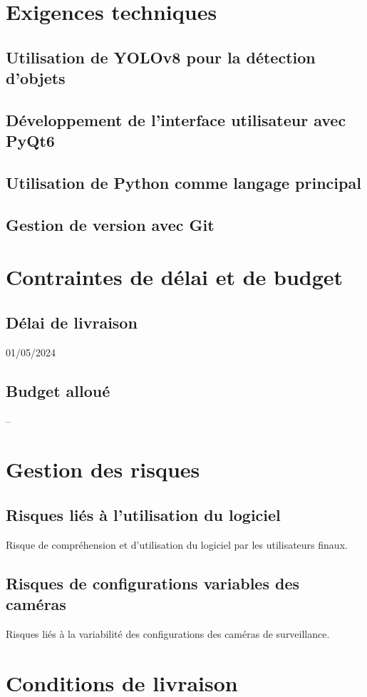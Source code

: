 \documentclass{article}
\begin{document}
\section{Exigences techniques}
\subsection{Utilisation de YOLOv8 pour la détection d'objets}
\subsection{Développement de l'interface utilisateur avec PyQt6}
\subsection{Utilisation de Python comme langage principal}
\subsection{Gestion de version avec Git}

\section{Contraintes de délai et de budget}
\subsection{Délai de livraison}
01/05/2024
\subsection{Budget alloué}
--

\section{Gestion des risques}
\subsection{Risques liés à l'utilisation du logiciel}
Risque de compréhension et d'utilisation du logiciel par les utilisateurs finaux.
\subsection{Risques de configurations variables des caméras}
Risques liés à la variabilité des configurations des caméras de surveillance.

\section{Conditions de livraison}
\end{document}
